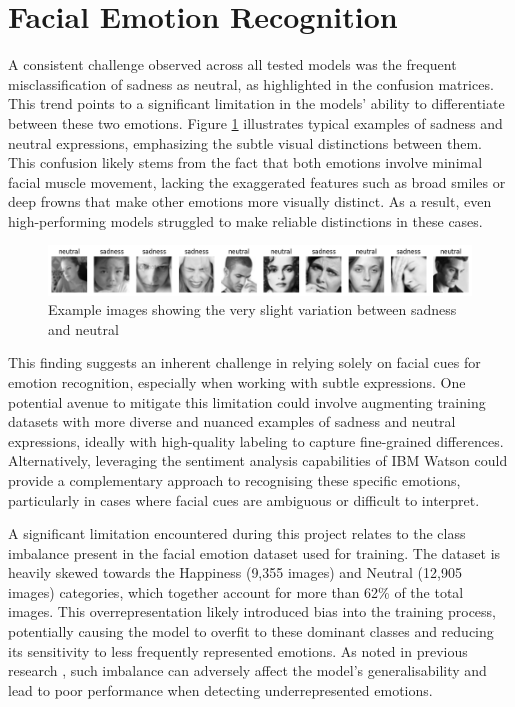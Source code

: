 \section{Facial Emotion Recognition}

A consistent challenge observed across all tested models was the frequent misclassification of sadness as neutral, as highlighted in the confusion matrices. This trend points to a significant limitation in the models' ability to differentiate between these two emotions. Figure \ref{figure:sadneutral} illustrates typical examples of sadness and neutral expressions, emphasizing the subtle visual distinctions between them. This confusion likely stems from the fact that both emotions involve minimal facial muscle movement, lacking the exaggerated features such as broad smiles or deep frowns that make other emotions more visually distinct. As a result, even high-performing models struggled to make reliable distinctions in these cases.

\begin{figure}[H]
    \centering{}
    \includegraphics[scale=0.38]{fed_images/sadness+neutral.png}
    \caption{Example images showing the very slight variation between sadness and neutral}
    \label{figure:sadneutral}
\end{figure}

This finding suggests an inherent challenge in relying solely on facial cues for emotion recognition, especially when working with subtle expressions. One potential avenue to mitigate this limitation could involve augmenting training datasets with more diverse and nuanced examples of sadness and neutral expressions, ideally with high-quality labeling to capture fine-grained differences. Alternatively, leveraging the sentiment analysis capabilities of IBM Watson could provide a complementary approach to recognising these specific emotions, particularly in cases where facial cues are ambiguous or difficult to interpret.

A significant limitation encountered during this project relates to the class imbalance present in the facial emotion dataset used for training. The dataset is heavily skewed towards the Happiness (9,355 images) and Neutral (12,905 images) categories, which together account for more than 62\% of the total images. This overrepresentation likely introduced bias into the training process, potentially causing the model to overfit to these dominant classes and reducing its sensitivity to less frequently represented emotions. As noted in previous research \cite{Rangulov2020-pd}, such imbalance can adversely affect the model's generalisability and lead to poor performance when detecting underrepresented emotions.

